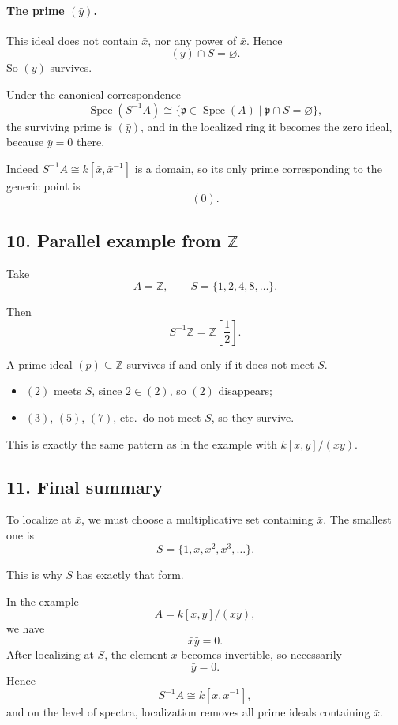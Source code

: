 \documentclass[12pt,a4paper]{article}
\theoremstyle{notespace}
\DeclareMathOperator{\Spec}{Spec}
\begin{document}
\paragraph{The prime \((\bar y)\).}
This ideal does not contain \(\bar x\), nor any power of \(\bar x\). Hence
\[
(\bar y)\cap S=\varnothing.
\]
So \((\bar y)\) survives.

Under the canonical correspondence
\[
\Spec(S^{-1}A)\cong
\{\mathfrak p\in\Spec(A)\mid \mathfrak p\cap S=\varnothing\},
\]
the surviving prime is \((\bar y)\), and in the localized ring it becomes the zero ideal, because \(\bar y=0\) there.

Indeed \(S^{-1}A\cong k[\bar x,\bar x^{-1}]\) is a domain, so its only prime corresponding to the generic point is
\[
(0).
\]

\subsection*{10. Parallel example from \(\mathbb Z\)}

Take
\[
A=\mathbb Z,
\qquad
S=\{1,2,4,8,\dots\}.
\]

Then
\[
S^{-1}\mathbb Z=\mathbb Z\!\left[\frac12\right].
\]

A prime ideal \((p)\subseteq\mathbb Z\) survives if and only if it does not meet \(S\).

\begin{itemize}
	\item \((2)\) meets \(S\), since \(2\in (2)\), so \((2)\) disappears;
	\item \((3)\), \((5)\), \((7)\), etc.\ do not meet \(S\), so they survive.
\end{itemize}

This is exactly the same pattern as in the example with \(k[x,y]/(xy)\).

\subsection*{11. Final summary}

To localize at \(\bar x\), we must choose a multiplicative set containing \(\bar x\). The smallest one is
\[
S=\{1,\bar x,\bar x^2,\bar x^3,\dots\}.
\]

This is why \(S\) has exactly that form.

In the example
\[
A=k[x,y]/(xy),
\]
we have
\[
\bar x\bar y=0.
\]
After localizing at \(S\), the element \(\bar x\) becomes invertible, so necessarily
\[
\bar y=0.
\]
Hence
\[
S^{-1}A\cong k[\bar x,\bar x^{-1}],
\]
and on the level of spectra, localization removes all prime ideals containing \(\bar x\).
\end{document}
